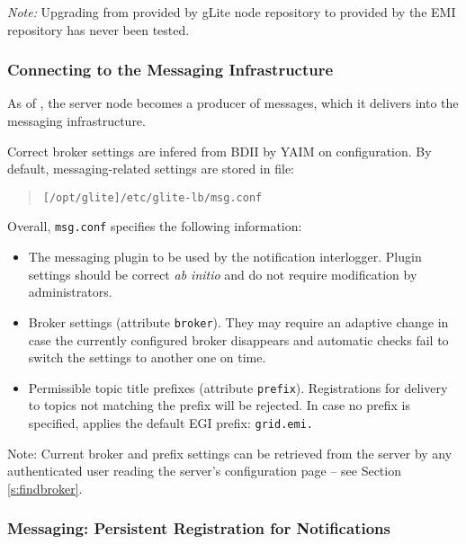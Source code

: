 \emph{Note:} Upgrading from  provided by gLite \LB node repository to  provided by the EMI repository has never been tested.


\subsubsection{Connecting to the Messaging Infrastructure}
\label{inst:messaging}

As of , the \LB server node becomes a producer of messages, which it delivers into the messaging infrastructure.

Correct broker settings are infered from BDII by YAIM on configuration. By default, messaging-related settings are stored in file:

  \begin{quote}
	\begin{verbatim}
[/opt/glite]/etc/glite-lb/msg.conf
	\end{verbatim}
  \end{quote}

Overall, \texttt{msg.conf} specifies the following information:

\begin{itemize}
\item The messaging plugin to be used by the notification interlogger. Plugin settings should be correct \emph{ab initio} and do not require modification by administrators.
\item Broker settings (attribute \texttt{broker}). They may require an adaptive change in case the currently configured broker disappears and automatic checks fail to switch the settings to another one on time.
\item Permissible topic title prefixes (attribute \texttt{prefix}). Registrations for delivery to topics not matching the prefix will be rejected. In case no prefix is specified, \LB applies the default EGI prefix: \texttt{grid.emi.}
\end{itemize}
Note: Current broker and prefix settings can be retrieved from the \LB server by any authenticated user reading the server's configuration page -- see Section \ref{s:findbroker}.


\subsubsection{Messaging: Persistent Registration for Notifications}
\label{inst:sitenotif}

